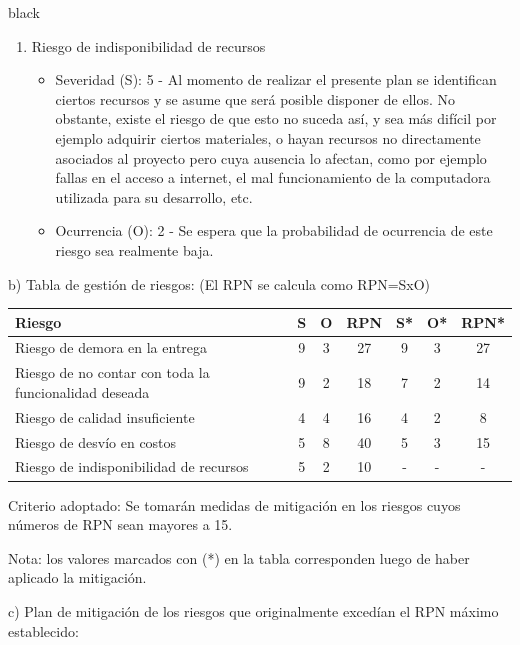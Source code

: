 \documentclass[
11pt, %
]{charter}
\begin{document}
\begin{consigna}{black}
\begin{enumerate}
\item Riesgo de indisponibilidad de recursos
\begin{itemize}
	\item Severidad (S): 5 - Al momento de realizar el presente plan se identifican ciertos recursos y se asume que será posible disponer de ellos. No obstante, existe el riesgo de que esto no suceda así, y sea más difícil por ejemplo adquirir ciertos materiales, o hayan recursos no directamente asociados al proyecto pero cuya ausencia lo afectan, como por ejemplo fallas en el acceso a internet, el mal funcionamiento de la computadora utilizada para su desarrollo, etc.
	\item Ocurrencia (O): 2 - Se espera que la probabilidad de ocurrencia de este riesgo sea realmente baja.
\end{itemize}

\end{enumerate}

b) Tabla de gestión de riesgos:      (El RPN se calcula como RPN=SxO)

\begin{table}[htpb]
\centering
\begin{tabularx}{\linewidth}{@{}|X|c|c|c|c|c|c|@{}}
\hline
\rowcolor[HTML]{C0C0C0}
Riesgo 													& S & O & RPN & S* & O* & RPN* \\ \hline
Riesgo de demora en la entrega							& 9 & 3 & 27 &  9  &  3  & 27    \\ \hline
Riesgo de no contar con toda la funcionalidad deseada	& 9 & 2 & 18  & 7  & 2 &  14    \\ \hline
Riesgo de calidad insuficiente							& 4 & 4 & 16 &  4 &  2 &   8  \\ \hline
Riesgo de desvío en costos								& 5 & 8 & 40 & 5  & 3  &  15   \\ \hline
Riesgo de indisponibilidad de recursos					& 5 & 2 & 10 & -  & -  &   -   \\ \hline
\end{tabularx}%
\end{table}

Criterio adoptado:
Se tomarán medidas de mitigación en los riesgos cuyos números de RPN sean mayores a 15.

Nota: los valores marcados con (*) en la tabla corresponden luego de haber aplicado la mitigación.

c) Plan de mitigación de los riesgos que originalmente excedían el RPN máximo establecido:
\begin{enumerate}



\end{enumerate}
\end{consigna}
\end{document}
